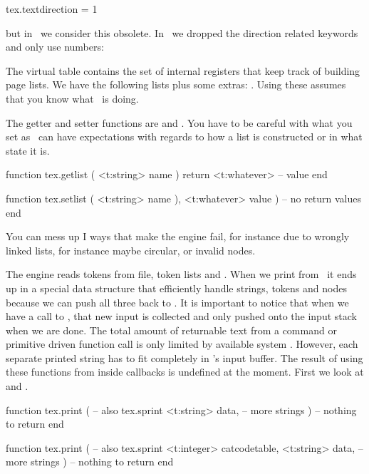\starttyping[option=LUA]
tex.textdirection = 1
\stoptyping

but in \CONTEXT\ we consider this obsolete. In \LUAMETATEX\ we dropped the
direction related keywords and only use numbers:


\stopsubsection

\startsubsection[title={Special lists}]

The virtual table  contains the set of internal registers that
keep track of building page lists. We have the following lists plus some extras:
. Using these assumes that you know what
\TEX\ is doing.

The getter and setter functions are  and . You have
to be careful with what you set as \TEX\ can have expectations with regards to
how a list is constructed or in what state it is.

\starttyping[option=LUA]
function tex.getlist ( <t:string> name )
    return <t:whatever> -- value
end

function tex.setlist ( <t:string> name ), <t:whatever> value )
    -- no return values
end
\stoptyping

You can mess up I ways that make the engine fail, for instance due to wrongly
linked lists, for instance maybe circular, or invalid nodes.

\stopsubsection

\startsubsection[title=Printing]

The engine reads tokens from file, token lists and \LUA. When we print from \LUA\
it ends up in a special data structure that efficiently handle strings, tokens
and nodes because we can push all three back to \TEX. It is important to notice
that when we have a call to \LUA, that new input is collected and only pushed
onto the input stack when we are done. The total amount of returnable text from a
\type {\directlua} command or primitive driven function call is only limited by
available system \RAM. However, each separate printed string has to fit
completely in \TEX's input buffer. The result of using these functions from
inside callbacks is undefined at the moment. First we look at 
and \type {tex.sprint}.

\starttyping[option=LUA]
function tex.print ( -- also tex.sprint
    <t:string> data,
    -- more strings
)
    -- nothing to return
end

function tex.print ( -- also tex.sprint
    <t:integer> catcodetable,
    <t:string>  data,
    -- more strings
)
    -- nothing to return
end


